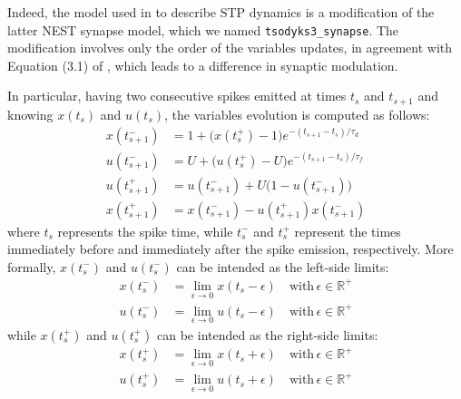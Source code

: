 \documentclass[a4paper, 12pt, twoside, openright]{book}
\begin{document}
Indeed, the model used in \cite{Tiddia2022_WM} to describe STP dynamics is a modification of the latter NEST synapse model, which we named \texttt{tsodyks3\_synapse}. 
The modification involves only the order of the variables updates, in agreement with Equation (3.1) of \cite{tsodyks1998}, which leads to a difference in synaptic modulation. 


In particular, having two consecutive spikes emitted at times $t_s$ and $t_{s+1}$ and knowing $x(t_s)$ and $u(t_s)$, the variables evolution is computed as follows:
\begin{equation}
\begin{split}
    x(t_{s+1}^-) &= 1 + \bigl(x(t_s^+) - 1\bigr)e^{-(t_{s+1}-t_{s})/\tau_d}\\
    u(t_{s+1}^-) &= U + \bigl(u(t_s^+) - U\bigr)e^{-(t_{s+1}-t_{s})/\tau_f}\\
    u(t_{s+1}^+) &= u(t_{s+1}^-) + U \bigl(1 - u(t_{s+1}^-)\bigr)\\
    x(t_{s+1}^+) &= x(t_{s+1}^-) - u(t_{s+1}^+)x(t_{s+1}^-)
    \label{eq:tsodyks3}
\end{split}
\end{equation}
where $t_s$ represents the spike time, while $t_s^-$ and $t_s^+$ represent the times immediately before and immediately after the spike emission, respectively. More formally, $x(t_s^-)$ and $u(t_s^-)$ can be intended as the left-side limits:
\begin{equation}
\begin{split}
    x(t_s^-) &= \lim_{\epsilon\rightarrow 0} x(t_s - \epsilon) \quad \text{with}\, \epsilon \in \mathbb{R}^+ \\
     u(t_s^-) &= \lim_{\epsilon\rightarrow 0} u(t_s - \epsilon) \quad \text{with}\, \epsilon \in \mathbb{R}^+
\end{split}
\end{equation}
while $x(t_s^+)$ and $u(t_s^+)$ can be intended as the right-side limits:
\begin{equation}
\begin{split}
    x(t_s^+) &= \lim_{\epsilon\rightarrow 0} x(t_s + \epsilon) \quad \text{with}\, \epsilon \in \mathbb{R}^+ \\
     u(t_s^+) &= \lim_{\epsilon\rightarrow 0} u(t_s + \epsilon) \quad \text{with}\, \epsilon \in \mathbb{R}^+
\end{split}
\end{equation}
\end{document}
